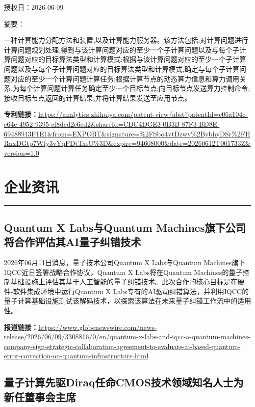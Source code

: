\documentclass[12pt,a4paper]{ctexart}
\begin{document}
授权日：2026-06-09

摘要：

一种计算能力分配方法和装置,以及计算能力服务器。该方法包括:对计算问题进行计算问题规划处理,得到与该计算问题对应的至少一个子计算问题以及与每个子计算问题对应的目标算法类型和计算模式;根据与该计算问题对应的至少一个子计算问题以及与每个子计算问题对应的目标算法类型和计算模式,确定与每个子计算问题对应的至少一个计算问题计算任务;根据计算节点的动态算力信息和算力调用关系,为每个计算问题计算任务确定至少一个目标节点;向目标节点发送算力控制命令;接收目标节点返回的计算结果,并将计算结果发送至应用节点。

\noindent\textbf{专利链接：}\url{https://analytics.zhihuiya.com/patent-view/abst?patentId=c06a104c-e64e-4952-9395-cf8ded2c6cd2&shareId=CDC4DGE3-0B3B-87F3-BD8E-69488913F1E1&from=EXPORT&signature=%2FSbo4vtDzwv%2BybhyDSr%2FHRaxDGtp7Wfy3vYqPDtTxsU%3D&expire=94608000&date=20260612T001733Z&version=1.0}




\newpage
\section{企业资讯}
\vspace{-0.5em}
\noindent\rule{\linewidth}{1.5pt}

\subsection{ Quantum X Labs与Quantum Machines旗下公司将合作评估其AI量子纠错技术 }

2026年06月11日消息，量子技术公司Quantum X Labs与Quantum Machines旗下IQCC近日签署战略合作协议，Quantum X Labs将在Quantum Machines的量子控制基础设施上评估其基于人工智能的量子纠错技术。此次合作的核心目标是在硬件-软件集成环境中运行Quantum X Labs专有的AI驱动纠错算法，并利用IQCC的量子计算基础设施测试该解码技术，以探索该算法在未来量子纠错工作流中的适用性。

\noindent\textbf{报道链接：}\url{https://www.globenewswire.com/news-release/2026/06/09/3308816/0/en/quantum-x-labs-and-iqcc-a-quantum-machines-company-sign-strategic-collaboration-agreement-to-evaluate-ai-based-quantum-error-correction-on-quantum-infrastructure.html}

\subsection{ 量子计算先驱Diraq任命CMOS技术领域知名人士为新任董事会主席 }
\end{document}
